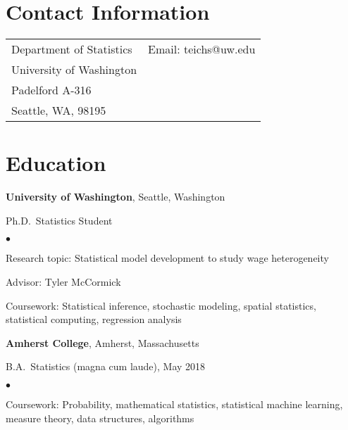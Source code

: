 \documentclass[margin,centered]{res}
\newenvironment{list1}{
  \begin{list}{\ding{113}}{%
      \setlength{\itemsep}{0in}
      \setlength{\parsep}{0in} \setlength{\parskip}{0in}
      \setlength{\topsep}{0in} \setlength{\partopsep}{0in}
      \setlength{\leftmargin}{0.17in}}}{\end{list}}
\newenvironment{list2}{
  \begin{list}{$\bullet$}{%
      \setlength{\itemsep}{0in}
      \setlength{\parsep}{0in} \setlength{\parskip}{0in}
      \setlength{\topsep}{0in} \setlength{\partopsep}{0in}
      \setlength{\leftmargin}{0.2in}}}{\end{list}}
\begin{document}
\vspace*{.1in}


\begin{resume}

\section{\sc Contact Information}

\vspace{.05in}
\begin{tabular}{@{}p{2.0in}p{2.9in}}
Department of Statistics& Email:  teichs@uw.edu \\
University of Washington  %
\\
Padelford A-316	                   	   \\
Seattle, WA, 98195             & \\






\end{tabular}

\section{\sc Education}
{\bf University of Washington}, Seattle, Washington
\begin{list1}
\item[] 
Ph.D.~Statistics Student
\begin{list2}
\vspace*{.05in}
\item Research topic: Statistical model development to study wage heterogeneity
\item Advisor: Tyler McCormick
\item Coursework: Statistical inference, stochastic modeling, spatial statistics, statistical computing, regression analysis
\end{list2}
\end{list1}



{\bf Amherst College}, Amherst, Massachusetts
\begin{list1}
\item[] B.A.~Statistics (magna cum laude), May 2018
\begin{list2}
\vspace*{.05in}
\item Coursework: Probability, mathematical statistics, statistical machine learning, measure theory, data
structures, algorithms
\end{list2}
\end{list1}



\end{resume}
\end{document}
